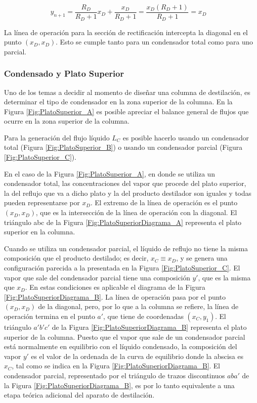 \documentclass[11pt]{book}
\begin{document}
\begin{equation}
    \label{eq:BalanceDestilacion_20}
    y_{n+1} = \frac{R_D}{R_D + 1} x_D + \frac{x_D}{R_D +1} = \frac{x_D (R_D+1)}{R_D + 1} = x_D
\end{equation}

La línea de operación para la sección de rectificación intercepta la diagonal en el punto $(x_D, x_D)$. Esto se cumple tanto para un condensador total como para uno parcial. 

\subsubsection{Condensado y Plato Superior}

Uno de los temas a decidir al momento de diseñar una columna de destilación, es determinar el tipo de condensador en la zona superior de la columna. En la Figura \ref{Fig:PlatoSuperior_A} es posible apreciar el balance general de flujos que ocurre en la zona superior de la columna. 

Para la generación del flujo líquido $L_C$ es posible hacerlo usando un condensador total (Figura \ref{Fig:PlatoSuperior_B}) o usando un condensador parcial (Figura \ref{Fig:PlatoSuperior_C}). 

En el caso de la Figura \ref{Fig:PlatoSuperior_A}, en donde se utiliza un condensador total, las concentraciones del vapor que procede del plato superior, la del reflujo que va a dicho plato y la del producto destilador son iguales y todas pueden representarse por $x_D$. El extremo de la línea de operación es el punto $(x_D, x_D)$, que es la intersección de la línea de operación con la diagonal. El triángulo abc de la Figura \ref{Fig:PlatoSuperiorDiagrama_A} representa el plato superior en la columna.

Cuando se utiliza un condensador parcial, el líquido de reflujo no tiene la misma composición que el producto destilado; es decir, $x_C \equiv x_D$, y se genera una configuración parecida a la presentada en la Figura \ref{Fig:PlatoSuperior_C}. El vapor que sale del condensador parcial tiene una composición $y'$, que es la misma que $x_D$. En estas condiciones es aplicable el diagrama de la Figura \ref{Fig:PlatoSuperiorDiagrama_B}. La línea de operación pasa por el punto $(x_D, x_D)$ de la diagonal, pero, por lo que a la columna se refiere, la línea de operación termina en el punto $a'$, que tiene de coordenadas $(x_C, y_1)$. El triángulo $a'b'c'$ de la Figura \ref{Fig:PlatoSuperiorDiagrama_B} representa el plato superior de la columna. Puesto que el vapor que sale de un condensador parcial está normalmente en equilibrio con el líquido condensado, la composición del vapor $y'$ es el valor de la ordenada de la curva de equilibrio donde la abscisa es $x_C$, tal como se indica en la Figura \ref{Fig:PlatoSuperiorDiagrama_B}. El condensador parcial, representado por el triángulo de trazos discontinuos $aba'$ de la Figura \ref{Fig:PlatoSuperiorDiagrama_B}, es por lo tanto equivalente a una etapa teórica adicional del aparato de destilación.
\end{document}
